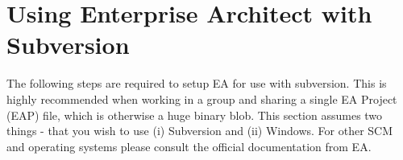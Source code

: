 \newpage

\section{Using Enterprise Architect with Subversion}
\visHeader

The following steps are required to setup EA for use with subversion. This is highly recommended when working in a group and sharing a single EA Project (EAP)
file, which is otherwise a huge binary blob. This section assumes two things - that you wish to use (i) Subversion and (ii) Windows. For other SCM
and operating systems please consult the official documentation from EA.









